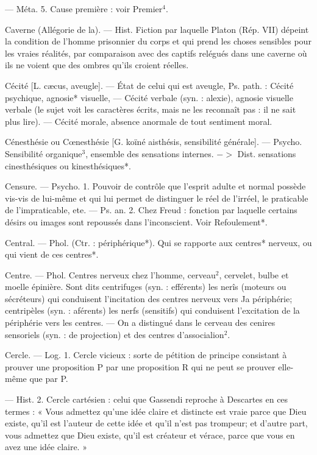 — Méta. 5. Cause première : voir
Premier$^4$.

Caverne (Allégorie de la). — Hist.
Fiction par laquelle Platon (Rép.
VII) dépeint la condition de l’homme
prisonnier du corps et qui prend les
%
choses sensibles pour les vraies réalités, par comparaison avec des
captifs relégués dans une caverne
où ils ne voient que des ombres
qu'ils croient réelles.

Cécité [L. cæcus, aveugle]. — État
de celui qui est aveugle, Ps. path. :
Cécité psychique, agnosie* visuelle,
— Cécité verbale (syn. : alexie),
agnosie visuelle verbale (le sujet
voit les caractères écrits, mais ne les
reconnaît pas : il ne sait plus lire).
— Cécité morale, absence anormale
de tout sentiment moral.

Cénesthésie ou Cœnesthésie [G. koïné
aisthésis, sensibilité générale]. —
Psycho. Sensibilité organique$^3$, ensemble des sensations internes.
$->$ Dist. sensations cinesthésiques
ou kinesthésiques*.

Censure. — Psycho. 1. Pouvoir de
contrôle que l'esprit adulte et normal possède vis-vis de lui-même
et qui lui permet de distinguer le
réel de l’irréel, le praticable de l’impraticable, ete. — Ps. an. 2. Chez
Freud : fonction par laquelle certains désirs ou images sont repoussés
dans l'inconscient. Voir Refoulement*.

Central. — Phol. (Ctr. : périphérique*).
Qui se rapporte aux centres* nerveux, ou qui vient de ces centres*.

Centre. — Phol. Centres nerveux
chez l’homme, cerveau$^2$, cervelet,
bulbe et moelle épinière. Sont dits
centrifuges (syn. : efférents) les nerîs
(moteurs ou sécréteurs) qui conduisent l'incitation des centres nerveux
vers Ja périphérie; centripèles (syn. :
aférents) les nerfs (sensitifs) qui
conduisent l'excitation de la périphérie vers les centres. — On a distingué dans le cerveau des cenires
sensoriels (syn. : de projection) et des
centres d'associalion$^2$.

Cercle. — Log. 1. Cercle vicieux : sorte
de pétition de principe consistant
à prouver une proposition P par
une proposition R qui ne peut se
prouver elle-même que par P.

— Hist. 2. Cercle cartésien : celui
que Gassendi reproche à Descartes
en ces termes : « Vous admettez
qu’une idée claire et distincte est
vraie parce que Dieu existe, qu'il
est l’auteur de cette idée et qu'il
n'est pas trompeur; et d'autre part,
vous admettez que Dieu existe, qu'il
est créateur et vérace, parce que
vous en avez une idée claire. »

